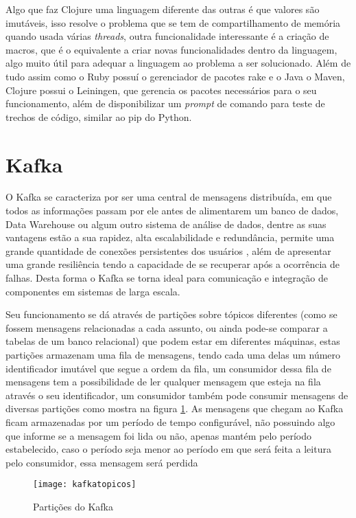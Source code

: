 Algo que faz Clojure uma linguagem diferente das outras é que valores são imutáveis, isso resolve o problema que se tem de compartilhamento de memória quando usada várias \textit{threads}, outra funcionalidade interessante é a criação de macros, que é o equivalente a criar novas funcionalidades dentro da linguagem, algo muito útil para adequar a linguagem ao problema a ser solucionado. Além de tudo assim como o Ruby possuí o gerenciador de pacotes rake e o Java o Maven, Clojure possui o Leiningen, que gerencia os pacotes necessários para o seu funcionamento, além de disponibilizar um \textit{prompt} de comando para teste de trechos de código, similar ao pip do Python.~\cite{hickey2010clojure}

\section{Kafka}
O Kafka se caracteriza por ser uma central de mensagens distribuída, em que todos as informações passam por ele antes de alimentarem um banco de dados, Data Warehouse ou algum outro sistema de análise de dados, dentre as suas vantagens estão a sua rapidez, alta escalabilidade e redundância, permite uma grande quantidade de conexões persistentes dos usuários , além de apresentar uma grande resiliência tendo a capacidade de se recuperar após a ocorrência de falhas. Desta forma o Kafka se torna ideal para comunicação e integração de componentes em sistemas de larga escala.

Seu funcionamento se dá através de partições sobre tópicos diferentes (como se fossem mensagens relacionadas a cada assunto, ou ainda pode-se comparar a tabelas de um banco relacional) que podem estar em diferentes máquinas, estas partições armazenam uma fila de mensagens, tendo cada uma delas um número identificador imutável que segue a ordem da fila, um consumidor dessa fila de mensagens tem a possibilidade de ler qualquer mensagem que esteja na fila através o seu identificador, um consumidor também pode consumir mensagens de diversas partições como mostra na figura \ref{fig:kafkatopicos}. As mensagens que chegam ao Kafka ficam armazenadas por um período de tempo configurável, não possuindo algo que informe se a mensagem foi lida ou não, apenas mantém pelo período estabelecido, caso o período seja menor ao período em que será feita a leitura pelo consumidor, essa mensagem será perdida

\begin{figure}[!h]
\caption{\label{fig:kafkatopicos} Partições do Kafka}
\begin{center}
\texttt{[image: kafkatopicos]}
\end{center}
\end{figure}

